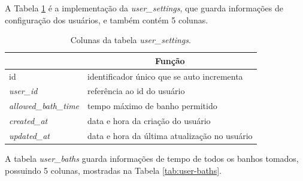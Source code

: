 A Tabela \ref{tab:user-settings} é a implementação da \textit{user\_settings}, que guarda informações de configuração dos usuários, e também contém 5 colunas.


\begin{table}[]
	\centering
	\begin{tabular}{|l|l|}
		\hline
		\rowcolor[HTML]{ECF4FF} 
		\multicolumn{1}{|c|}{\cellcolor[HTML]{ECF4FF}Coluna} & \multicolumn{1}{c|}{\cellcolor[HTML]{ECF4FF}Função} \\ \hline
		id                                                   & identificador único que se auto incrementa          \\ \hline
		\textit{user\_id}                                    & referência ao id do usuário                         \\ \hline
		\textit{allowed\_bath\_time}                         & tempo máximo de banho permitido                     \\ \hline
		\textit{created\_at}                                 & data e hora da criação do usuário                   \\ \hline
		\textit{updated\_at}                                 & data e hora da última atualização no usuário        \\ \hline
	\end{tabular}
	\caption{Colunas da tabela \textit{user\_settings}.}
	\label{tab:user-settings}
\end{table}

A tabela \textit{user\_baths} guarda informações de tempo de todos os banhos tomados, possuindo 5 colunas, mostradas na Tabela \ref{tab:user-baths}.


